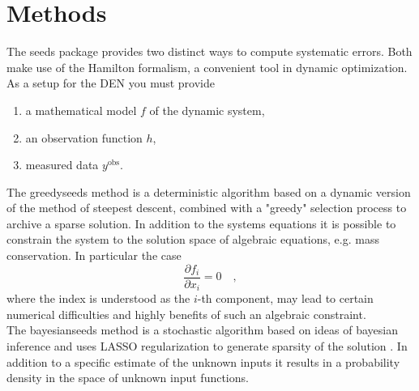 \section{Methods}
The \textsf{seeds} package provides two distinct ways to compute systematic errors. Both make 
use of the Hamilton formalism, a convenient tool in dynamic optimization. 
As a setup for the DEN you must provide
\begin{enumerate}
	\item a mathematical model $f$ of the dynamic system,
	\item an observation function $h$,
	\item measured data $y^\text{obs}$. 
\end{enumerate}
The \textsf{greedyseeds} method is a deterministic algorithm based on a dynamic version of the 
method of steepest descent, combined with a "greedy" selection process to archive a sparse 
solution. In addition to the systems equations it is possible to constrain the system to the 
solution space of algebraic equations, e.g. mass conservation. In particular the case
\begin{equation}
	\frac{\partial f_i}{\partial x_i} = 0 \quad ,
\end{equation} 
where the index is understood as the $i$-th component, may lead to certain numerical 
difficulties and highly benefits of such an algebraic constraint.
\\

The \textsf{bayesianseeds} method is a stochastic algorithm based on ideas of bayesian 
inference and uses LASSO regularization to generate sparsity of the solution \cite{BDEN}. 
In addition to 
a specific estimate of the unknown inputs it results in a probability density in the 
space of unknown input functions.